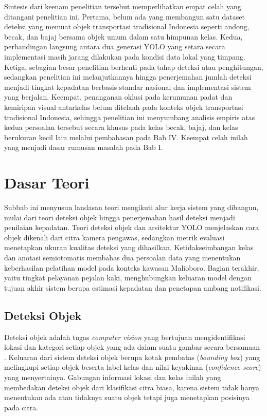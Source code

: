 Sintesis dari keenam penelitian tersebut memperlihatkan empat celah yang ditangani penelitian 
ini. Pertama, belum ada yang membangun satu dataset deteksi yang memuat objek transportasi 
tradisional Indonesia seperti andong, becak, dan bajaj bersama objek umum dalam satu 
himpunan kelas. Kedua, perbandingan langsung antara dua generasi YOLO yang setara secara 
implementasi masih jarang dilakukan pada kondisi data lokal yang timpang. Ketiga, sebagian 
besar penelitian berhenti pada tahap deteksi atau penghitungan, sedangkan penelitian ini 
melanjutkannya hingga penerjemahan jumlah deteksi menjadi tingkat kepadatan berbasis standar 
nasional dan implementasi sistem yang berjalan. Keempat, penanganan oklusi pada kerumunan 
padat dan kemiripan visual antarkelas belum ditelaah pada konteks objek transportasi 
tradisional Indonesia, sehingga penelitian ini menyumbang analisis empiris atas kedua 
persoalan tersebut secara khusus pada kelas becak, bajaj, dan kelas berukuran kecil lain 
melalui pembahasan pada Bab IV. Keempat celah inilah yang menjadi dasar 
rumusan masalah pada Bab I.

\section{Dasar Teori}

Subbab ini menyusun landasan teori mengikuti alur kerja sistem yang dibangun, mulai dari 
teori deteksi objek hingga penerjemahan hasil deteksi menjadi penilaian kepadatan. Teori 
deteksi objek dan arsitektur YOLO menjelaskan cara objek dikenali dari citra kamera 
pengawas, sedangkan metrik evaluasi menetapkan ukuran kualitas deteksi yang dihasilkan. 
Ketidakseimbangan kelas dan anotasi semiotomatis membahas dua persoalan data yang 
menentukan keberhasilan pelatihan model pada konteks kawasan Malioboro. Bagian terakhir, 
yaitu tingkat pelayanan pejalan kaki, menghubungkan keluaran model dengan tujuan akhir 
sistem berupa estimasi kepadatan dan penetapan ambang notifikasi.

\subsection{Deteksi Objek}

Deteksi objek adalah tugas \textit{computer vision} yang bertujuan mengidentifikasi 
lokasi dan kategori setiap objek yang ada dalam suatu gambar secara bersamaan 
\cite{oksuz2021imbalance}. Keluaran dari sistem deteksi objek berupa kotak pembatas 
(\textit{bounding box}) yang melingkupi setiap objek beserta label kelas dan nilai 
keyakinan (\textit{confidence score}) yang menyertainya. Gabungan informasi lokasi dan 
kelas inilah yang membedakan deteksi objek dari klasifikasi citra biasa, karena sistem 
tidak hanya menentukan ada atau tidaknya suatu objek tetapi juga menetapkan posisinya 
pada citra.


